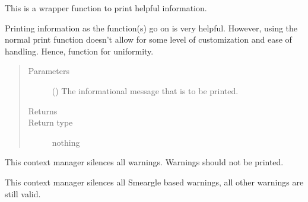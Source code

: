 \documentclass[letterpaper,10pt,english]{sphinxmanual}
\begin{document}
\begin{fulllineitems}
\label{\detokenize{python_docstrings/IfA_Smeargle.meta.errors:IfA_Smeargle.meta.errors.smeargle_info}}
This is a wrapper function to print helpful information.

Printing information as the function(s) go on is very helpful. However,
using the normal print function doesn’t allow for some level of
customization and ease of handling. Hence, function for uniformity.
\begin{quote}\begin{description}
\item[{Parameters}] \leavevmode
{} () \textendash{} The informational message that is to be printed.

\item[{Returns}] \leavevmode


\item[{Return type}] \leavevmode
nothing

\end{description}\end{quote}

\end{fulllineitems}


\begin{fulllineitems}
\label{\detokenize{python_docstrings/IfA_Smeargle.meta.errors:IfA_Smeargle.meta.errors.smeargle_silence_all_warnings}}
This context manager silences all warnings. Warnings should not be
printed.

\end{fulllineitems}


\begin{fulllineitems}
\label{\detokenize{python_docstrings/IfA_Smeargle.meta.errors:IfA_Smeargle.meta.errors.smeargle_silence_ifas_warnings}}
This context manager silences all Smeargle based warnings, all other
warnings are still valid.

\end{fulllineitems}
\end{document}
